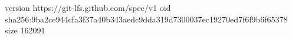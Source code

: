 version https://git-lfs.github.com/spec/v1
oid sha256:9ba2ce944cfa3f37a40b343aedc9dda319d7300037ec19270ed7f6f9b6f65378
size 162091
